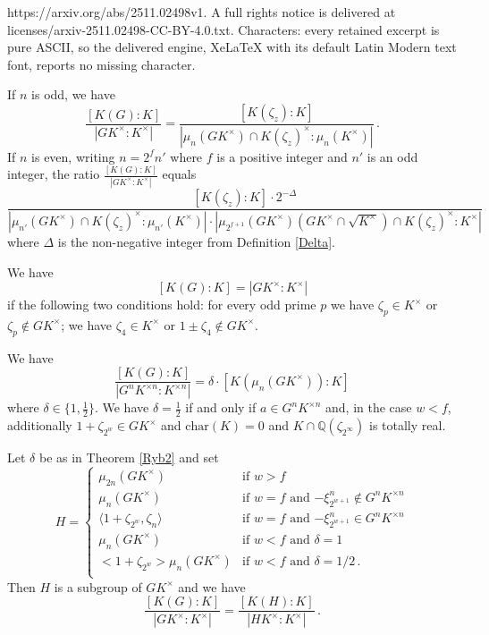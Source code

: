 \documentclass[10pt,a4paper]{amsart}
\newcommand{\Q}{\mathbb{Q}}
\newcommand{\ch}{\mathrm{char}}
\begin{document}
https://arxiv.org/abs/2511.02498v1. A full rights notice is delivered at licenses/arxiv-2511.02498-CC-BY-4.0.txt. Characters: every retained excerpt is pure ASCII, so the delivered engine, XeLaTeX with its default Latin Modern text font, reports no missing character.
\begin{thm}\label{mainthm}
If $n$ is odd, we have
$$\frac{[K(G):K]}{|GK^\times:K^\times|}=\frac{[K(\zeta_{z}):K]}{|\mu_{n}(G K^\times)\cap K(\zeta_{z})^\times: \mu_{n}(K^\times)|}\,.$$
If $n$ is even, writing $n=2^f n'$ where $f$ is a positive integer and $n'$ is an odd integer, the ratio $\frac{[K(G):K]}{|GK^\times:K^\times|}$ equals 
$$\frac{[K(\zeta_{z}):K] \cdot 2^{-\Delta}}{|\mu_{n'}(G K^\times)\cap K(\zeta_{z})^\times: \mu_{n'}( K^\times)|\cdot |\mu_{2^{f+1}}(G K^\times)(G K^\times\cap\sqrt{K^\times})\cap K(\zeta_z)^\times: K^\times|}$$
where $\Delta$ is the non-negative integer from Definition \ref{Delta}.
\end{thm}

\begin{thm}\label{Kneserthm}
We have 
$$[K(G):K]=|GK^\times:K^\times|$$
if the following two conditions hold: for every odd prime $p$ we have $\zeta_p\in K^\times$ or $\zeta_p\notin GK^\times$; we have $\zeta_4\in K^\times$ or $1\pm \zeta_4\notin G K^\times$. 
\end{thm}

\begin{thm}[Rybowicz]\label{Ryb2}
We have 
$$\frac{[K(G):K]}{|G^nK^{\times n}:K^{\times n}|}=\delta \cdot [K(\mu_n(GK^\times)):K]$$
where $\delta\in \{1,\frac{1}{2}\}$.
We have $\delta=\frac{1}{2}$ if and only if $a\in G^nK^{\times n}$ and, in the case $w<f$, additionally $1+\zeta_{2^w}\in GK^\times$ and $\ch(K)=0$ and $K\cap \Q(\zeta_{2^\infty})$ is totally real.
\end{thm}

\begin{thm}\label{better2}
Let $\delta$ be as in Theorem \ref{Ryb2} and set
$$H=\begin{cases} \mu_{2n}(GK^\times) & \text{if $w>f$}\\
\mu_{n}(GK^\times) & \text{if $w=f$ and $-\xi_{2^{w+1}}^n\notin G^nK^{\times n}$}\\
\langle 1+\zeta_{2^w}, \zeta_n\rangle & \text{if $w=f$ and $-\xi_{2^{w+1}}^n\in G^nK^{\times n}$}\\
\mu_{n}(GK^\times) & \text{if $w<f$ and $\delta=1$}\\
<1+\zeta_{2^w}>\mu_{n}(GK^\times)& \text{if $w<f$ and $\delta=1/2$}\,.\\
\end{cases}$$
Then $H$ is a subgroup of $GK^\times$ and we have
$$\frac{[K(G):K]}
{|GK^{\times}:K^{\times}|}= \frac{[K(H):K]}
{|HK^{\times}:K^{\times}|}\,.$$
\end{thm}
\end{document}
